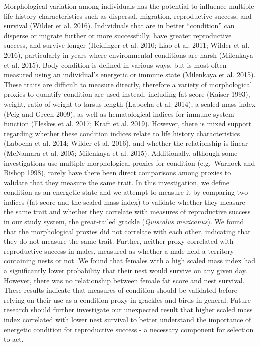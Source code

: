 \documentclass[
]{article}
\begin{document}
Morphological variation among individuals has the potential to influence
multiple life history characteristics such as dispersal, migration,
reproductive success, and survival (Wilder et al. 2016). Individuals
that are in better ``condition'' can disperse or migrate further or more
successfully, have greater reproductive success, and survive longer
(Heidinger et al. 2010; Liao et al. 2011; Wilder et al. 2016),
particularly in years where environmental conditions are harsh
(Milenkaya et al. 2015). Body condition is defined in various ways, but
is most often measured using an individual's energetic or immune state
(Milenkaya et al. 2015). These traits are difficult to measure directly,
therefore a variety of morphological proxies to quantify condition are
used instead, including fat score (Kaiser 1993), weight, ratio of weight
to tarsus length (Labocha et al. 2014), a scaled mass index (Peig and
Green 2009), as well as hematological indices for immune system function
(Fleskes et al. 2017; Kraft et al. 2019). However, there is mixed
support regarding whether these condition indices relate to life history
characteristics (Labocha et al. 2014; Wilder et al. 2016), and whether
the relationship is linear (McNamara et al. 2005; Milenkaya et al.
2015). Additionally, although some investigations use multiple
morphological proxies for condition (e.g.~Warnock and Bishop 1998),
rarely have there been direct comparisons among proxies to validate that
they measure the same trait. In this investigation, we define condition
as an energetic state and we attempt to measure it by comparing two
indices (fat score and the scaled mass index) to validate whether they
measure the same trait and whether they correlate with measures of
reproductive success in our study system, the great-tailed grackle
(\emph{Quiscalus mexicanus}). We found that the morphological proxies
did not correlate with each other, indicating that they do not measure
the same trait. Further, neither proxy correlated with reproductive
success in males, measured as whether a male held a territory containing
nests or not. We found that females with a high scaled mass index had a
significantly lower probability that their nest would survive on any
given day. However, there was no relationship between female fat score
and nest survival. These results indicate that measures of condition
should be validated before relying on their use as a condition proxy in
grackles and birds in general. Future research should further
investigate our unexpected result that higher scaled mass index
correlated with lower nest survival to better understand the importance
of energetic condition for reproductive success - a necessary component
for selection to act.
\end{document}
